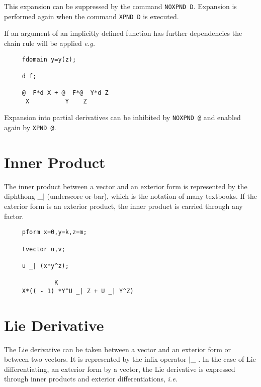 \documentclass[11pt,letterpaper]{book}
\begin{document}
This expansion can be suppressed by the command {\tt NOXPND
D}\label{NOXPNDD}.
Expansion is performed again when the command {\tt XPND D}\label{XPNDD}
is executed.

If an argument of an implicitly defined function has further
dependencies the chain rule will be applied {\em e.g.}


{\small\begin{verbatim}
     fdomain y=y(z);

     d f;

     @  F*d X + @  F*@  Y*d Z
      X          Y    Z
\end{verbatim}}

Expansion into partial derivatives can be inhibited by
{\tt NOXPND @}\label{NOXPNDA}
and enabled again by {\tt XPND @}\label{XPNDA}.

\section{Inner Product}
The inner product between a vector and an exterior form is represented
by the diphthong \_$|$ \label{innerp} (underscore or-bar), which is the
notation of many textbooks.  If the exterior form is an exterior
product, the inner product is carried through any factor.

\example{}

{\small\begin{verbatim}
     pform x=0,y=k,z=m;

     tvector u,v;

     u _| (x*y^z);

              K
     X*(( - 1) *Y^U _| Z + U _| Y^Z)
\end{verbatim}}

\section{Lie Derivative}

The Lie derivative can be taken between a vector and an exterior form
or between two vectors.  It is represented by the infix operator $|$\_
\label{lie}.  In the case of Lie differentiating, an exterior form by
a vector, the Lie derivative is expressed through inner products and
exterior differentiations, {\em i.e.}
\end{document}

